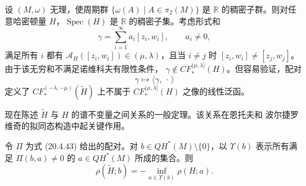 \begin{example}
\label{ex:22-irrational-duality-failure}
设 $(M,\omega)$ 无理，使周期群
$\{\omega(A)\mid A\in\pi_2(M)\}$ 是 $\mathbb R$ 的稠密子群。则对任意哈密顿量
$H$，$\operatorname{Spec}(H)$ 是 $\mathbb R$ 的稠密子集。考虑形式和
\[
 \gamma=\sum_{i=1}^\infty a_i[z_i,w_i],\qquad a_i\neq0,
\]
满足所有 $i$ 都有 $\mathcal A_H([z_i,w_i])\in(\mu,\lambda)$，且当 $i\neq j$ 时
$[z_i,w_i]\neq[z_j,w_j]$。由于该无穷和不满足诺维科夫有限性条件，
$\gamma\notin CF_*^{(\mu,\lambda]}(H)$。但容易验证，配对
\[
 \gamma\longmapsto\langle\gamma,\,\cdot\,\rangle
\]
定义了 $CF_*^{(-\lambda,-\mu)}(\widetilde H)$ 上不属于
$CF_*^{(\mu,\lambda]}(H)$ 之像的线性泛函。
\end{example}

现在陈述 $\widetilde H$ 与 $H$ 的谱不变量之间关系的一般定理。该关系在恩托夫和
波尔捷罗维奇的拟同态构造中起关键作用。

\begin{lemma}
\label{lem:22-spectral-duality}
令 $\Pi$ 为式 (20.4.43) 给出的配对。对
$b\in QH^*(M)\setminus\{0\}$，以 $\Upsilon(b)$ 表示所有满足
$\Pi(b,a)\neq0$ 的 $a\in QH^*(M)$ 所成的集合。则
\begin{equation}
 \rho(\widetilde H;b)=-\inf_{a\in\Upsilon(b)}\rho(H;a).
 \label{eq:22-spectral-duality}
\end{equation}
\end{lemma}


